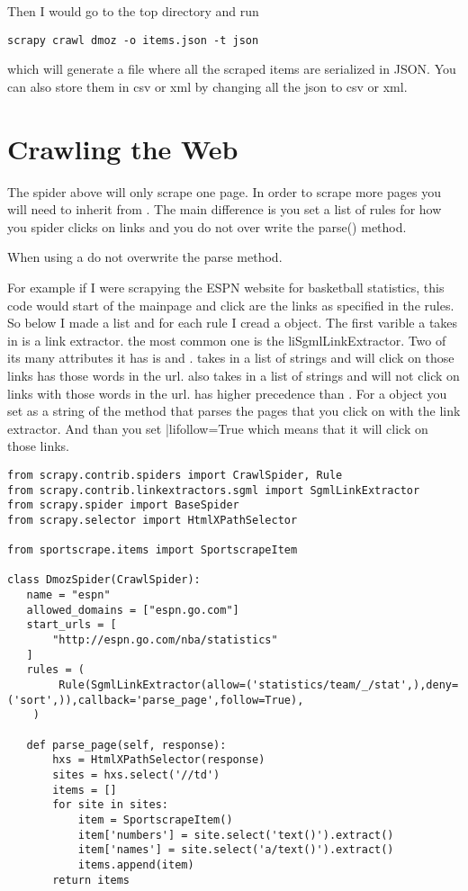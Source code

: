 Then I would go to the top directory and run
\begin{lstlisting}
scrapy crawl dmoz -o items.json -t json
\end{lstlisting}
which will generate a file  where all the scraped items are serialized in JSON. You can also store them in csv or xml by changing all the json to csv or xml.

\section*{Crawling the Web}
The spider above will only scrape one page. In order to scrape more pages you will need to inherit from . The main difference is you set a list of rules for how you spider clicks on links and you do not over write the parse() method.

\begin{warn}
When using a  do not overwrite the parse method.
\end{warn}

For example if I were scrapying the ESPN website for basketball statistics, this code would start of the mainpage and click are the links as specified in the rules. So below I made a list and for each rule I cread a  object. The first varible a takes in is a link extractor. the most common one is the li{SgmlLinkExtractor}. Two of its many attributes it has is  and .  takes in a list of strings and will click on those links has those words in the url.  also takes in a list of strings and will not click on links with those words in the url.  has higher precedence than . For a  object you set  as a string of the method that parses the pages that you click on with the link extractor.  And than you set |li{follow=True} which means that it will click on those links.

\begin{lstlisting}
from scrapy.contrib.spiders import CrawlSpider, Rule
from scrapy.contrib.linkextractors.sgml import SgmlLinkExtractor
from scrapy.spider import BaseSpider
from scrapy.selector import HtmlXPathSelector

from sportscrape.items import SportscrapeItem

class DmozSpider(CrawlSpider):
   name = "espn"
   allowed_domains = ["espn.go.com"]
   start_urls = [
       "http://espn.go.com/nba/statistics"
   ]
   rules = (
        Rule(SgmlLinkExtractor(allow=('statistics/team/_/stat',),deny=('sort',)),callback='parse_page',follow=True),
    )

   def parse_page(self, response):
       hxs = HtmlXPathSelector(response)
       sites = hxs.select('//td')
       items = []
       for site in sites:
           item = SportscrapeItem()
           item['numbers'] = site.select('text()').extract()
           item['names'] = site.select('a/text()').extract()
           items.append(item)
       return items
\end{lstlisting}

